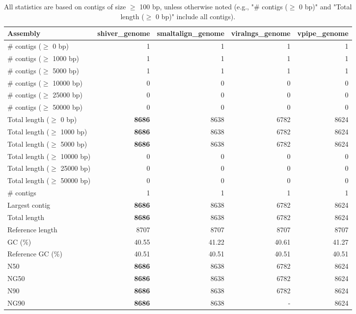 \documentclass[12pt,a4paper]{article}
\begin{document}
\begin{table}[ht]
\begin{center}
\caption{All statistics are based on contigs of size $\geq$ 100 bp, unless otherwise noted (e.g., "\# contigs ($\geq$ 0 bp)" and "Total length ($\geq$ 0 bp)" include all contigs).}
\begin{tabular}{|l*{4}{|r}|}
\hline
Assembly & shiver\_genome & smaltalign\_genome & viralngs\_genome & vpipe\_genome \\ \hline
\# contigs ($\geq$ 0 bp) & 1 & 1 & 1 & 1 \\ \hline
\# contigs ($\geq$ 1000 bp) & 1 & 1 & 1 & 1 \\ \hline
\# contigs ($\geq$ 5000 bp) & 1 & 1 & 1 & 1 \\ \hline
\# contigs ($\geq$ 10000 bp) & 0 & 0 & 0 & 0 \\ \hline
\# contigs ($\geq$ 25000 bp) & 0 & 0 & 0 & 0 \\ \hline
\# contigs ($\geq$ 50000 bp) & 0 & 0 & 0 & 0 \\ \hline
Total length ($\geq$ 0 bp) & {\bf 8686} & 8638 & 6782 & 8624 \\ \hline
Total length ($\geq$ 1000 bp) & {\bf 8686} & 8638 & 6782 & 8624 \\ \hline
Total length ($\geq$ 5000 bp) & {\bf 8686} & 8638 & 6782 & 8624 \\ \hline
Total length ($\geq$ 10000 bp) & 0 & 0 & 0 & 0 \\ \hline
Total length ($\geq$ 25000 bp) & 0 & 0 & 0 & 0 \\ \hline
Total length ($\geq$ 50000 bp) & 0 & 0 & 0 & 0 \\ \hline
\# contigs & 1 & 1 & 1 & 1 \\ \hline
Largest contig & {\bf 8686} & 8638 & 6782 & 8624 \\ \hline
Total length & {\bf 8686} & 8638 & 6782 & 8624 \\ \hline
Reference length & 8707 & 8707 & 8707 & 8707 \\ \hline
GC (\%) & 40.55 & 41.22 & 40.61 & 41.27 \\ \hline
Reference GC (\%) & 40.51 & 40.51 & 40.51 & 40.51 \\ \hline
N50 & {\bf 8686} & 8638 & 6782 & 8624 \\ \hline
NG50 & {\bf 8686} & 8638 & 6782 & 8624 \\ \hline
N90 & {\bf 8686} & 8638 & 6782 & 8624 \\ \hline
NG90 & {\bf 8686} & 8638 & - & 8624 \\ \hline

\end{tabular}
\end{center}
\end{table}
\end{document}
